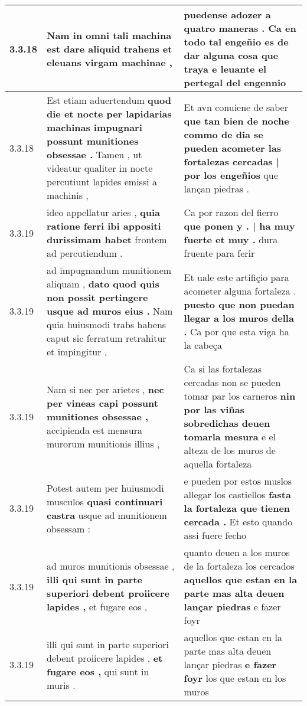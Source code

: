 \begin{tabular}{|p{1cm}|p{6.5cm}|p{6.5cm}|}
3.3.18 & Nam in omni tali machina est \textbf{ dare aliquid trahens } et eleuans virgam machinae , & puedense adozer a quatro maneras . \textbf{ Ca en todo tal engeñio es de dar alguna cosa que traya } e leuante el pertegal del engennio \\\hline
3.3.18 & Est etiam aduertendum \textbf{ quod die et nocte per lapidarias machinas impugnari possunt munitiones obsessae . } Tamen , ut videatur qualiter in nocte percutiunt lapides emissi a machinis , & Et avn conuiene de saber \textbf{ que tan bien de noche commo de dia se pueden acometer las fortalezas cercadas | por los engeñios } que lançan piedras . \\\hline
3.3.19 & ideo appellatur aries , \textbf{ quia ratione ferri ibi appositi durissimam habet } frontem ad percutiendum . & Ca por razon del fierro \textbf{ que ponen y . | ha muy fuerte et muy . } dura fruente para ferir \\\hline
3.3.19 & ad impugnandum munitionem aliquam , \textbf{ dato quod quis non possit pertingere usque ad muros eius . } Nam quia huiusmodi trabs habens caput sic ferratum retrahitur et impingitur , & Et uale este artifiçio para acometer alguna fortaleza . \textbf{ puesto que non puedan llegar a los muros della . } Ca por que esta viga ha la cabeça \\\hline
3.3.19 & Nam si nec per arietes , \textbf{ nec per vineas capi possunt munitiones obsessae , } accipienda est mensura murorum munitionis illius , & Ca si las fortalezas cercadas non se pueden tomar par los carneros \textbf{ nin por las viñas sobredichas deuen tomarla mesura } e el alteza de los muros de aquella fortaleza \\\hline
3.3.19 & Potest autem per huiusmodi musculos \textbf{ quasi continuari castra } usque ad munitionem obsessam : & e pueden por estos muslos allegar los castiellos \textbf{ fasta la fortaleza que tienen cercada . } Et esto quando assi fuere fecho \\\hline
3.3.19 & ad muros munitionis obsessae , \textbf{ illi qui sunt in parte superiori debent proiicere lapides , } et fugare eos , & quanto deuen a los muros de la fortaleza los cercados \textbf{ aquellos que estan en la parte mas alta deuen lançar piedras } e fazer foyr \\\hline
3.3.19 & illi qui sunt in parte superiori debent proiicere lapides , \textbf{ et fugare eos , } qui sunt in muris . & aquellos que estan en la parte mas alta deuen lançar piedras \textbf{ e fazer foyr } los que estan en los muros \\\hline

\end{tabular}

